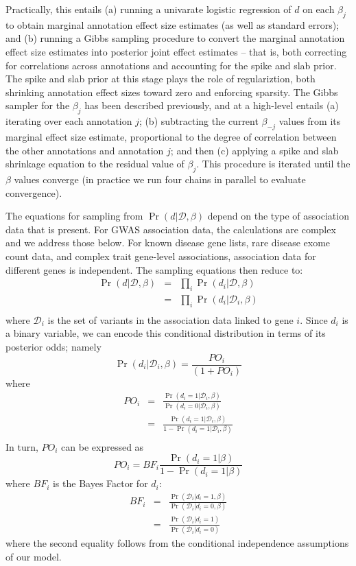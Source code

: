 \documentclass[11pt]{article}
\begin{document}
Practically, this entails (a) running a univarate logistic regression of $d$ on each
    $\beta_j$ to obtain marginal annotation effect size estimates (as
    well as standard errors); and (b) running a Gibbs sampling
    procedure to convert the marginal annotation effect size estimates
    into posterior joint effect estimates -- that is, both correcting
    for correlations across annotations and accounting for the spike
    and slab prior. The spike and slab prior at this stage plays the
    role of regulariztion, both shrinking annotation effect sizes
    toward zero and enforcing sparsity. The Gibbs sampler for the
    $\beta_j$ has been described previously, and at a high-level
    entails (a) iterating over each annotation $j$; (b) subtracting the
    current $\beta_{-j}$ values from its marginal effect size
    estimate, proportional to the degree of correlation between the
    other annotations and annotation $j$; and then (c) applying a
    spike and slab shrinkage equation to the residual value of
    $\beta_j$. This procedure is iterated until the $\beta$ values
    converge (in practice we run four chains in parallel to evaluate
    convergence\cite{}).

    
The equations for sampling from
$\Pr\left(d|\mathcal{D},\beta\right)$ depend on the
type of association data that is present. For GWAS association data,
the calculations are complex and we address those below. For known disease gene
lists, rare disease exome count data, and complex trait gene-level
associations, association data for different genes is independent. The
sampling equations then reduce to:
\begin{eqnarray*}
  \Pr\left(d|\mathcal{D},\beta\right) &=&
  \prod_i\Pr\left(d_i|\mathcal{D},\beta\right) \\
  &=& \prod_i\Pr\left(d_i|\mathcal{D}_i,\beta\right) \\
\end{eqnarray*}
where $\mathcal{D}_i$ is the set of variants in the association data
linked to gene $i$.
Since $d_i$ is a binary variable, we can encode this conditional
distribution in terms of its posterior odds; namely
\[\Pr\left(d_i|\mathcal{D}_i,\beta\right) = \frac{PO_i}{\left(1 + PO_i\right)} \]
where
\begin{eqnarray*}
  PO_i & = &
\frac{\Pr\left(d_i=1|\mathcal{D}_i,\beta\right)}{\Pr\left(d_i=0|\mathcal{D}_i,\beta\right)}\\
& = & \frac{\Pr\left(d_i=1|\mathcal{D}_i,\beta\right)}{1 - \Pr\left(d_i=1|\mathcal{D}_i,\beta\right)}\\
\end{eqnarray*}
In turn, $PO_i$ can be expressed as
\[PO_i = BF_i\frac{\Pr\left(d_i=1|\beta\right)}{1-\Pr\left(d_i=1|\beta\right)}\]
where $BF_i$ is the Bayes Factor for $d_i$:
\begin{eqnarray*}
  BF_i & = &
  \frac{\Pr\left(\mathcal{D}_i|d_i=1,\beta\right)}{\Pr\left(\mathcal{D}_i|d_i=0,\beta\right)} \\
  & = & \frac{\Pr\left(\mathcal{D}_i|d_i=1\right)}{\Pr\left(\mathcal{D}_i|d_i=0\right)}
\end{eqnarray*}
where the second equality follows from the conditional independence
assumptions of our model.
\end{document}
